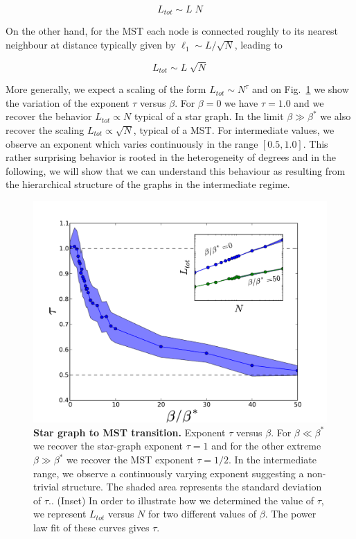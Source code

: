\begin{equation}
    L_{tot} \sim L\; N
    \label{eq:Ltot_star}
\end{equation}

On the other hand, for the MST each node is connected roughly to its nearest
neighbour at distance typically given by $\ell_1\sim L/\sqrt{N}$, leading to

\begin{equation}
    L_{tot} \sim L\; \sqrt{N}
    \label{eq:Ltot_MST}
\end{equation}

More generally, we expect a scaling of the form $L_{tot}\sim N^\tau$ and on
Fig.~\ref{fig:Ltot_vs_beta} we show the variation of the exponent $\tau$ versus
$\beta$. For $\beta=0$ we have $\tau=1.0$ and we recover the behavior $L_{tot}
\propto N$ typical of a star graph. In the limit $\beta \gg \beta^*$ we also
recover the scaling $L_{tot} \propto \sqrt{N}$, typical of a MST. For
intermediate values, we observe an exponent which varies continuously in the
range $[0.5,1.0]$. This rather surprising behavior is rooted in the
heterogeneity of degrees and in the following, we will show that we can
understand this behaviour as resulting from the hierarchical structure of the
graphs in the intermediate regime. 

\begin{figure}
    \centering
    \includegraphics[width=\textwidth]{gfx/chapter-networks/figure3.pdf} 
    \caption{{\bf Star graph to MST transition.} Exponent $\tau$ versus $\beta$.
For $\beta\ll \beta^*$ we recover the star-graph exponent $\tau=1$ and for the
other extreme $\beta\gg\beta^*$ we recover the MST exponent $\tau=1/2$. In the
intermediate range, we observe a continuously varying exponent suggesting a
non-trivial structure. The shaded area represents the standard deviation of
$\tau$.\label{fig:Ltot_vs_beta}. (Inset) In order to illustrate how we determined
the value of $\tau$, we represent $L_{tot}$ versus $N$ for two different values
of $\beta$. The power law fit of these curves gives $\tau$.} 
\end{figure}

